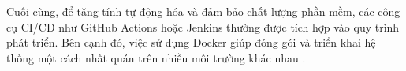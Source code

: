       \begin{flushleft}
        \hspace*{0.8cm}Cuối cùng, để tăng tính tự động hóa và đảm bảo chất lượng phần mềm, các công cụ CI/CD như GitHub Actions hoặc Jenkins thường được tích hợp vào quy trình phát triển. Bên cạnh đó, việc sử dụng Docker giúp đóng gói và triển khai hệ thống một cách nhất quán trên nhiều môi trường khác nhau \cite{cicd}.
      \end{flushleft}
   